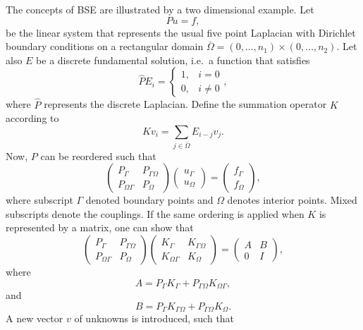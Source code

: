 \documentclass{report}
\begin{document}
The concepts of BSE are illustrated by a two dimensional example. Let
\[
Pu=f,
\]
be the linear system that represents the usual five point Laplacian
with Dirichlet boundary conditions on a rectangular domain
$\bar{\Omega}=(0,\ldots,n_1)\times(0,\ldots,n_2)$. Let also $E$ be a
discrete fundamental solution, i.e.~a function that satisfies
\[
\hat{P}E_i = \left\{ \begin{array}{ll}
1, &i=0\\
0, &i\ne 0 \end{array} \right. ,
\]
where $\hat{P}$ represents the discrete Laplacian. Define the
summation operator $K$ according to
\[
Kv_i=\sum_{j\in\bar{\Omega}}E_{i-j}v_j.
\]
Now, $P$ can be reordered such that
\begin{equation}
\label{eq:Puf}
\left( \begin{array}{cc} P_{\Gamma}&P_{\Gamma\Omega}\\
P_{\Omega\Gamma}&P_{\Omega} \end{array} \right)
\left( \begin{array}{c} u_{\Gamma}\\u_{\Omega} \end{array} \right)
=\left( \begin{array}{c} f_{\Gamma}\\f_{\Omega} \end{array} \right),
\end{equation}
where subscript $\Gamma$ denoted boundary points and $\Omega$ denotes
interior points. Mixed subscripts denote the couplings. If the same
ordering is applied when $K$ is represented by a matrix, one can show
that
\begin{equation}
\label{eq:KP}
\left( \begin{array}{cc} P_{\Gamma}&P_{\Gamma\Omega}\\
P_{\Omega\Gamma} & P_{\Omega} \end{array} \right)
\left( \begin{array}{cc} K_{\Gamma}&K_{\Gamma\Omega}\\
K_{\Omega\Gamma}&K_{\Omega} \end{array} \right)
=\left( \begin{array}{cc} A&B\\0&I \end{array} \right),
\end{equation}
where
\[
A=P_{\Gamma}K_{\Gamma} + P_{\Gamma\Omega}K_{\Omega\Gamma},
\]
and
\[
B=P_{\Gamma}K_{\Gamma\Omega}+P_{\Gamma\Omega}K_{\Omega}.
\]
A new vector $v$ of unknowns is introduced, such that
\end{document}
